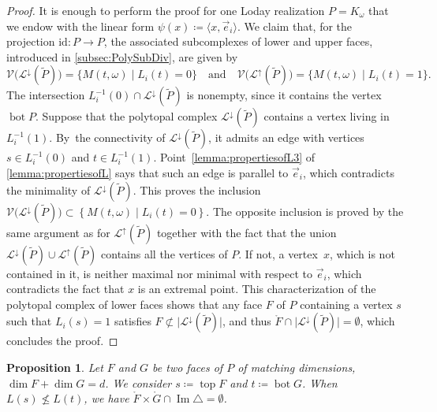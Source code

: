 \documentclass[JEP,XML,SOM,Unicode,NoFloatCountersInSection]{cedram}
\let\mathcal\mathscr
\theoremstyle{plain}
\newtheorem{proposition}{Proposition}
\theoremstyle{definition}
\newcommand{\K}{{K}}
\newcommand{\La}{\mathcal{L}}
\DeclareMathOperator{\tp}{top}
\DeclareMathOperator{\bm}{bot}
\newcommand{\ang}[1]{\langle #1\rangle}
\newcommand{\Ve}{\mathcal{V}}
\newcommand{\id}{\mathrm{id}}
\DeclareMathOperator{\im}{\mathrm{Im}}
\begin{document}
\begin{proof}
It is enough to perform the proof for one Loday realization $P=\K_\omega$ that we endow with the linear form
$\psi(x)\coloneqq \ang{x, \vec e_i}$.
We claim that, for the projection $\id : P \to P$, the associated subcomplexes of lower and upper faces, introduced in \cref{subsec:PolySubDiv}, are given by
\[\Ve\big(\La^{\downarrow}(\tilde P)\big)=\{
M(t,\omega)\mid L_i(t)=0
\}
\quad
\text{and}
\quad
\Ve\big(\La^{\uparrow}(\tilde P)\big)=\{
M(t,\omega)\mid L_i(t)=1
\}.
\]
The intersection $L_i^{-1}(0)\cap \La^{\downarrow}(\tilde P)$
is nonempty, since it contains the vertex $\bm P$. Suppose that the polytopal complex
$\La^{\downarrow}(\tilde P)$ contains a vertex living in $L_i^{-1}(1)$. By~the connectivity of $\La^{\downarrow}(\tilde P)$, it admits an edge with vertices $s\in L_i^{-1}(0)$ and $t\in L_i^{-1}(1)$.
Point~\eqref{lemma:propertiesofL3} of \cref{lemma:propertiesofL} says that such an edge is parallel to $\vec e_i$, which contradicts the minimality of $\La^{\downarrow}(\tilde P)$.
This proves the inclusion
$\Ve\big(\La^{\downarrow}(\tilde P)\big)
\subset
\left\{
M(t,\omega)\mid L_i(t)=0
\right\}$.
The opposite inclusion is proved by the same argument as for
$\La^{\uparrow}(\tilde P)$
together with the fact that
the union $\La^{\downarrow}(\tilde P)\cup \La^{\uparrow}(\tilde P)$ contains all the vertices of $P$.
If not, a vertex~$x$, which is not contained in it, is neither maximal nor minimal with respect to $\vec e_i$, which contradicts the fact that $x$ is an extremal point.
This characterization of the polytopal complex of lower faces shows that any face $F$ of $P$ containing a vertex $s$ such that $L_i(s) = 1$ satisfies
$ F\not \subset\vert\La^{\downarrow}(\tilde P)\vert$, and thus
$\mathring F \cap \big\vert\La^{\downarrow}(\tilde P)\big\vert=\emptyset$, which concludes the proof.
\end{proof}

\begin{proposition}\label{prop:FirstExclusion}
Let $F$ and $G$ be two faces of $P$ of matching dimensions, \ie $\dim F+\dim G=d$. We consider
$s\coloneqq \tp F$ and $t\coloneqq \bm G$.
When $L(s)\not\leq L(t)$, we have $\mathring{F}\times \mathring{G}\cap \im\triangle = \emptyset$.
\end{proposition}
\end{document}
